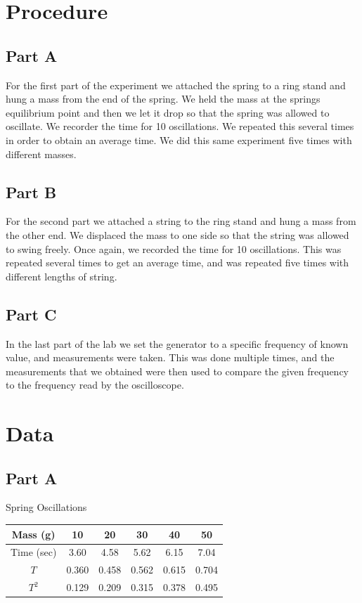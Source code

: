 \documentclass[titlepage]{article}
\begin{document}
\section{Procedure}\label{sec:procedure}
\subsection{Part A}\label{sub:part_a}
For the first part of the experiment we attached the spring to a ring stand and hung a mass from the end of the spring. We held the mass at the springs equilibrium point and then we let it drop so that the spring was allowed to oscillate. We recorder the time for 10 oscillations. We repeated this several times in order to obtain an average time. We did this same experiment five times with different masses.

\subsection{Part B}\label{sub:part_b}
For the second part we attached a string to the ring stand and hung a mass from the other end. We displaced the mass to one side so that the string was allowed to swing freely. Once again, we recorded the time for 10 oscillations. This was repeated several times to get an average time, and was repeated five times with different lengths of string.

\subsection{Part C}\label{sub:part_c}
In the last part of the lab we set the generator to a specific frequency of known value, and measurements were taken. This was done multiple times, and the measurements that we obtained were then used to compare the given frequency to the frequency read by the oscilloscope.

\section{Data}\label{sec:data}
\subsection{Part A}\label{sub:part_a}

Spring Oscillations
\begin{tabular}{cccccc}
\hline
Mass (g) & 10 & 20 & 30 & 40 & 50\\
\hline
Time (sec) & 3.60 & 4.58 & 5.62 & 6.15 & 7.04\\
\hline
$T$ & 0.360 & 0.458 & 0.562 & 0.615 & 0.704\\
\hline
$T^2$ & 0.129 & 0.209 & 0.315 & 0.378 & 0.495\\
\hline
\end{tabular}
\end{document}

